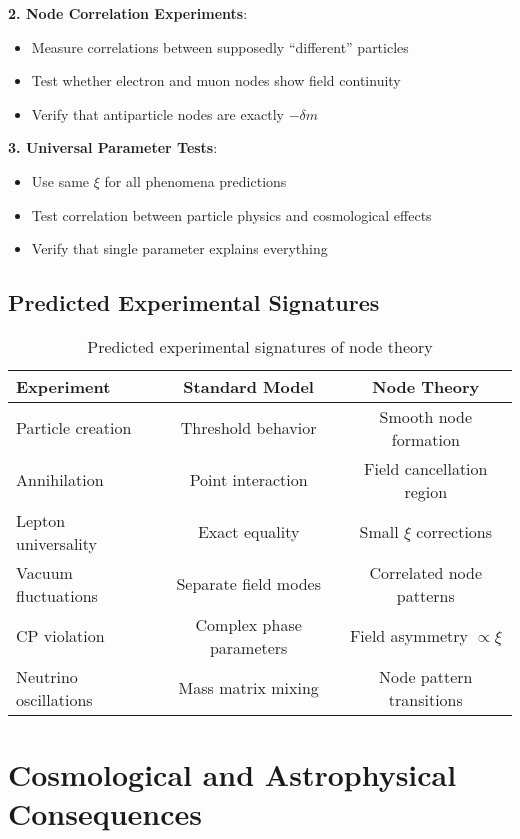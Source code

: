 \documentclass[12pt,a4paper]{article}
\newcommand{\deltam}{\delta m}
\newcommand{\xipar}{\xi}
\theoremstyle{definition}
\theoremstyle{remark}
\begin{document}
	\textbf{2. Node Correlation Experiments}:
	\begin{itemize}
		\item Measure correlations between supposedly ``different'' particles
		\item Test whether electron and muon nodes show field continuity
		\item Verify that antiparticle nodes are exactly $-\deltam$
	\end{itemize}
	
	\textbf{3. Universal Parameter Tests}:
	\begin{itemize}
		\item Use same $\xipar$ for all phenomena predictions
		\item Test correlation between particle physics and cosmological effects
		\item Verify that single parameter explains everything
	\end{itemize}
	
	\subsection{Predicted Experimental Signatures}
	
	\begin{table}[htbp]
		\centering
		\begin{tabular}{lcc}
			\toprule
			\textbf{Experiment} & \textbf{Standard Model} & \textbf{Node Theory} \\
			\midrule
			Particle creation & Threshold behavior & Smooth node formation \\
			Annihilation & Point interaction & Field cancellation region \\
			Lepton universality & Exact equality & Small $\xipar$ corrections \\
			Vacuum fluctuations & Separate field modes & Correlated node patterns \\
			CP violation & Complex phase parameters & Field asymmetry $\propto \xipar$ \\
			Neutrino oscillations & Mass matrix mixing & Node pattern transitions \\
			\bottomrule
		\end{tabular}
		\caption{Predicted experimental signatures of node theory}
		\label{tab:experimental_signatures}
	\end{table}
	
	\section{Cosmological and Astrophysical Consequences}
	
\end{document}
